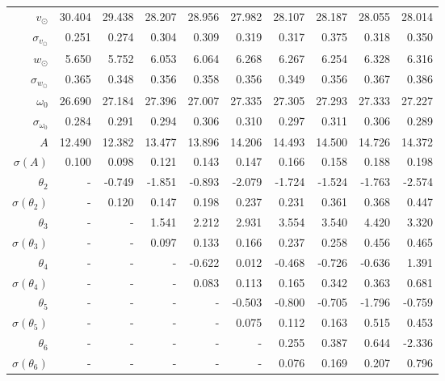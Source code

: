 \documentclass{matmex-diploma-custom}
\begin{document}
\begin{table}[h!!]
\begin{tabular}{r|rrr|rrr|rrr}
 $v_{\odot} $& 30.404      &  29.438 &  28.207 &  28.956 &  27.982 &  28.107 &  28.187 &  28.055 &  28.014 \\
 $\sigma_{v_{\odot}}$&0.251       &   0.274 &   0.304 &   0.309 &   0.319 &   0.317 &   0.375 &   0.318 &    0.350 \\
 $w_{\odot} $& 5.650       &   5.752 &   6.053 &   6.064 &   6.268 &   6.267 &   6.254 &   6.328 &   6.316 \\
 $\sigma_{w_{\odot}}$&0.365       &   0.348 &   0.356 &   0.358 &   0.356 &   0.349 &   0.356 &   0.367 &   0.386 \\
 $\omega_0 $&26.690      &  27.184 &  27.396 &  27.007 &  27.335 &  27.305 &  27.293 &  27.333 &  27.227 \\
 $\sigma_{\omega_0} $& 0.284       &   0.291 &   0.294 &   0.306 &    0.310 &   0.297 &   0.311 &   0.306 &   0.289 \\\hline
 $A $&12.490      &  12.382 &  13.477 &  13.896 &  14.206 &  14.493 &    14.500 &  14.726 &  14.372 \\
 $\sigma(A) $ & 0.100       &   0.098 &   0.121 &   0.143 &   0.147 &   0.166 &   0.158 &   0.188 &   0.198 \\
 $\theta_2$&-        &  -0.749 &  -1.851 &  -0.893 &  -2.079 &  -1.724 &  -1.524 &  -1.763 &  -2.574 \\
 $\sigma(\theta_2)$&-      &    0.120 &   0.147 &   0.198 &   0.237 &   0.231 &   0.361 &   0.368 &   0.447 \\
 $\theta_3$&-      &    - &   1.541 &   2.212 &   2.931 &   3.554 &   3.540 &   4.420 &   3.320 \\
 $\sigma(\theta_3)$&-      &    - &   0.097 &   0.133 &   0.166 &   0.237 &   0.258 &   0.456 &   0.465 \\
 $\theta_4$&-      &    - &    - &  -0.622 &   0.012 &  -0.468 &  -0.726 &  -0.636 &   1.391 \\
 $\sigma(\theta_4)$&-      &    - &    - &     0.083 &   0.113 &   0.165 &   0.342 &   0.363 &   0.681 \\
 $\theta_5$&-      &    - &    - &    - &  -0.503 &  -0.800 &  -0.705 &  -1.796 &  -0.759 \\
 $\sigma(\theta_5)$&-      &    - &    - &    - &     0.075 &   0.112 &   0.163 &   0.515 &   0.453 \\
 $\theta_6$&-      &    - &    - &    - &    - &   0.255 &   0.387 &   0.644 &  -2.336 \\
 $\sigma(\theta_6)$&-    &    - &    - &    - &    - &   0.076 &   0.169 &   0.207 &   0.796 \\

\end{tabular}
\end{table}
\end{document}
